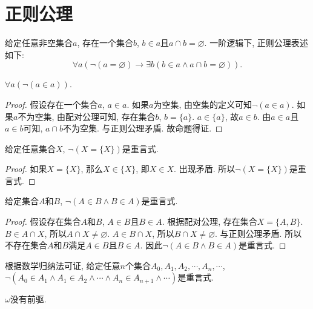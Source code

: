 \chapter{正则公理}

\begin{axiom}[正则公理]
	给定任意非空集合$a$, 存在一个集合$b$, $b\in a$且$a\cap b=\varnothing$. 一阶逻辑下, 正则公理表述如下:
	\begin{equation}
		\forall a(\neg(a=\varnothing)\rightarrow \exists b(b\in a\wedge a\cap b=\varnothing)).
	\end{equation}
\end{axiom}

\begin{proposition}
	$\forall a(\neg (a\in a))$.
\end{proposition}

\begin{proof}
	假设存在一个集合$a$, $a\in a$. 如果$a$为空集, 由空集的定义可知$\neg(a\in a)$. 如果$a$不为空集, 由配对公理可知, 存在集合$b$, $b=\{a\}$. $a\in \{a\}$, 故$a\in b$. 由$a\in a$且$a\in b$可知, $a\cap b$不为空集. 与正则公理矛盾. 故命题得证.
\end{proof}

\begin{proposition}
	给定任意集合$X$, $\neg (X=\{X\})$是重言式.
\end{proposition}

\begin{proof}
	如果$X=\{X\}$, 那么$X\in \{X\}$, 即$X\in X$. 出现矛盾. 所以$\neg (X=\{X\})$是重言式.
\end{proof}

\begin{proposition}
	给定集合$A$和$B$, $\neg(A\in B\wedge B\in A)$是重言式.
\end{proposition}

\begin{proof}
	假设存在集合$A$和$B$, $A\in B$且$B\in A$. 根据配对公理, 存在集合$X=\{A,B\}$. $B\in A\cap X$, 所以$A\cap X\neq \varnothing$. $A\in B\cap X$, 所以$B\cap X\neq \varnothing$. 与正则公理矛盾. 所以不存在集合$A$和$B$满足$A\in B$且$B\in A$. 因此$\neg(A\in B\wedge B\in A)$是重言式.
\end{proof}

根据数学归纳法可证, 给定任意$n$个集合$A_0,A_1,A_2,\cdots,A_n,\cdots$, $\neg(A_0\in A_1\wedge A_1\in A_2\wedge \cdots \wedge A_n\in A_{n+1}\wedge \cdots)$是重言式.

\begin{proposition}
	$\omega$没有前驱.
\end{proposition}

